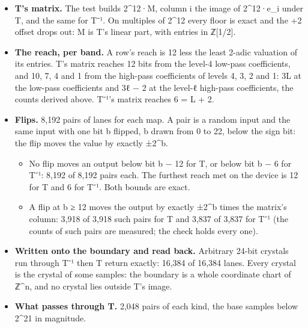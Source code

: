 \begin{itemize}
\item \textbf{T's matrix.} The test builds 2\textasciicircum{}12·M, column i the image of 2\textasciicircum{}12·e\_\allowbreak{}i under T, and the same for T⁻¹. On multiples of 2\textasciicircum{}12 every floor is exact and the +2 offset drops out: M is T's linear part, with entries in ℤ[1/2].
\item \textbf{The reach, per band.} A row's reach is 12 less the least 2-adic valuation of its entries. T's matrix reaches 12 bits from the level-4 low-pass coefficients, and 10, 7, 4 and 1 from the high-pass coefficients of levels 4, 3, 2 and 1: 3L at the low-pass coefficients and 3ℓ − 2 at the level-ℓ high-pass coefficients, the counts derived above. T⁻¹'s matrix reaches 6 = L + 2.
\item \textbf{Flips.} 8,192 pairs of lanes for each map. A pair is a random input and the same input with one bit b flipped, b drawn from 0 to 22, below the sign bit: the flip moves the value by exactly ±2\textasciicircum{}b.

\begin{itemize}
\item No flip moves an output below bit b − 12 for T, or below bit b − 6 for T⁻¹: 8,192 of 8,192 pairs each. The furthest reach met on the device is 12 for T and 6 for T⁻¹. Both bounds are exact.
\item A flip at b ≥ 12 moves the output by exactly ±2\textasciicircum{}b times the matrix's column: 3,918 of 3,918 such pairs for T and 3,837 of 3,837 for T⁻¹ (the counts of such pairs are measured; the check holds every one).
\end{itemize}
\item \textbf{Written onto the boundary and read back.} Arbitrary 24-bit crystals run through T⁻¹ then T return exactly: 16,384 of 16,384 lanes. Every crystal is the crystal of some samples: the boundary is a whole coordinate chart of ℤ\textasciicircum{}n, and no crystal lies outside T's image.
\item \textbf{What passes through T.} 2,048 pairs of each kind, the base samples below 2\textasciicircum{}21 in magnitude.


\end{itemize}
